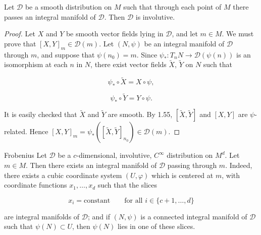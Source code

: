 \begin{proposition}\label{thm:1.59}
	Let $\mathcal{D}$ be a smooth distribution on $M$ such that through each point of $M$ there passes an integral manifold of $\mathcal{D}$. Then $\mathcal{D}$ is involutive.

\end{proposition}

\begin{proof}
	Let $X$ and $Y$ be smooth vector fields lying in $\mathcal{D}$, and let $m \in M$. We must prove that $[X, Y]_{m} \in \mathcal{D}(m)$. Let $(N, \psi)$ be an integral manifold of $\mathcal{D}$ through $m$, and suppose that $\psi(n_0) = m$. Since $\psi_{*}: T_{n} N \to \mathcal{D}(\psi(n))$ is an isomorphism at each $n$ in $N$, there exist vector fields $\widetilde{X}$, $\widetilde{Y}$ on $N$ such that

	\begin{equation}
		\tag{1}\label{eq:1.59:1}
		\psi_{*}\circ\tilde{X}=X\circ\psi,
	\end{equation}

	\[
		\psi_{*}\circ\tilde{Y}=Y\circ\psi.
	\]

	It is easily checked that $\tilde{X}$ and $\tilde{Y}$ are smooth. By 1.55, $[\tilde{X},\tilde{Y}]$ and $[X,Y]$ are $\psi$-related. Hence $[X,Y]_{m}=\psi_{*}([\tilde{X},\tilde{Y}]_{n_{0}})\in\mathcal{D}(m)$.

\end{proof}

\begin{theorem}{Frobenius}\label{thm:1.60}
	Let $\mathcal{D}$ be a $c$-dimensional, involutive, $C^{\infty}$ distribution on $M^{d}$. Let $m\in M$. Then there exists an integral manifold of $\mathcal{D}$ passing through $m$. Indeed, there exists a cubic coordinate system $(U,\varphi)$ which is centered at $m$, with coordinate functions $x_{1},\ldots,x_{d}$ such that the slices

	\begin{equation}
		\tag{1}\label{eq:1.60:1}
		x_{i}=\mathrm{constant}\qquad\text{for all }i\in\{c+1,\ldots,d\}
	\end{equation}

	are integral manifolds of $\mathcal{D}$; and if $(N,\psi)$ is a connected integral manifold of $\mathcal{D}$ such that $\psi(N)\subset U$, then $\psi(N)$ lies in one of these slices.

\end{theorem}

